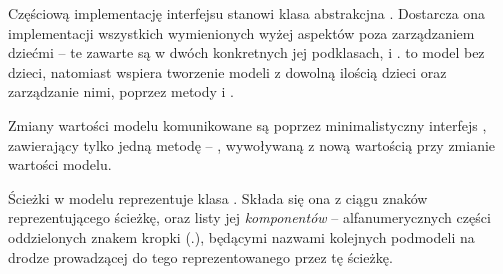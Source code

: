 Częściową implementację interfejsu  stanowi klasa abstrakcjna .
Dostarcza ona implementacji wszystkich wymienionych wyżej aspektów poza zarządzaniem dziećmi -- te
zawarte są w dwóch konkretnych jej podklasach,  i .
 to model bez dzieci, natomiast  wspiera tworzenie modeli z
dowolną ilością dzieci oraz zarządzanie nimi, poprzez metody  i .

Zmiany wartości modelu komunikowane są poprzez minimalistyczny interfejs ,
zawierający tylko jedną metodę -- , wywoływaną z nową wartością przy zmianie wartości
modelu.

Ścieżki w modelu reprezentuje klasa . Składa się ona z ciągu znaków reprezentującego
ścieżkę, oraz listy jej \emph{komponentów} -- alfanumerycznych części oddzielonych znakem kropki
(.), będącymi nazwami kolejnych podmodeli na drodze prowadzącej do tego reprezentowanego przez tę
ścieżkę. 

